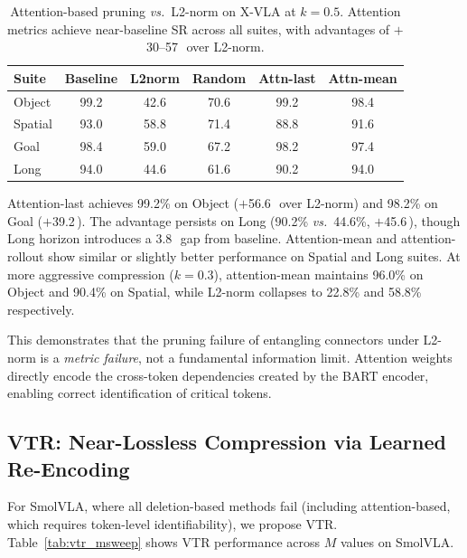 \documentclass[10pt,letterpaper]{article}
\newcommand{\pp}{\,\text{pp}}
\newcommand{\vs}{\textit{vs.}}
\begin{document}
\begin{table}[t]
\centering
\caption{Attention-based pruning \vs\ L2-norm on X-VLA at $k\!=\!0.5$. Attention metrics achieve near-baseline SR across all suites, with advantages of $+$30--57\pp\ over L2-norm.}
\label{tab:attention_pruning}
\small
\begin{tabular}{lccccc}
\toprule
Suite & Baseline & L2norm & Random & Attn-last & Attn-mean \\
\midrule
Object & 99.2 & 42.6 & 70.6 & 99.2 & 98.4 \\
Spatial & 93.0 & 58.8 & 71.4 & 88.8 & 91.6 \\
Goal & 98.4 & 59.0 & 67.2 & 98.2 & 97.4 \\
Long & 94.0 & 44.6 & 61.6 & 90.2 & 94.0 \\
\bottomrule
\end{tabular}
\end{table}

Attention-last achieves 99.2\% on Object ($+$56.6\pp\ over L2-norm) and 98.2\% on Goal ($+$39.2\pp). The advantage persists on Long (90.2\% \vs\ 44.6\%, $+$45.6\pp), though Long horizon introduces a 3.8\pp\ gap from baseline. Attention-mean and attention-rollout show similar or slightly better performance on Spatial and Long suites. At more aggressive compression ($k\!=\!0.3$), attention-mean maintains 96.0\% on Object and 90.4\% on Spatial, while L2-norm collapses to 22.8\% and 58.8\% respectively.

This demonstrates that the pruning failure of entangling connectors under L2-norm is a \emph{metric failure}, not a fundamental information limit. Attention weights directly encode the cross-token dependencies created by the BART encoder, enabling correct identification of critical tokens.


\subsection{VTR: Near-Lossless Compression via Learned Re-Encoding}
\label{sec:vtr}

For SmolVLA, where all deletion-based methods fail (including attention-based, which requires token-level identifiability), we propose VTR. Table~\ref{tab:vtr_msweep} shows VTR performance across $M$ values on SmolVLA.
\end{document}

